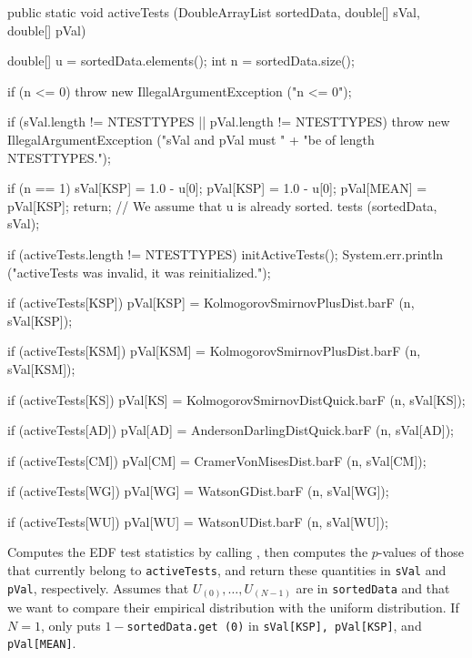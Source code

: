 \begin{htmlonly}
\end{htmlonly}
\begin{code}

   public static void activeTests (DoubleArrayList sortedData,
                                   double[] sVal, double[] pVal)\begin{hide} {

      double[] u = sortedData.elements();
      int n = sortedData.size();

      if (n <= 0)
        throw new IllegalArgumentException ("n <= 0");

      if (sVal.length != NTESTTYPES || pVal.length != NTESTTYPES)
        throw new IllegalArgumentException ("sVal and pVal must " +
              "be of length NTESTTYPES.");

      if (n == 1) {
         sVal[KSP] = 1.0 - u[0];
         pVal[KSP] = 1.0 - u[0];
         pVal[MEAN] = pVal[KSP];
         return;
      }
      // We assume that u is already sorted.
      tests (sortedData, sVal);

      if (activeTests.length != NTESTTYPES) {
        initActiveTests();
        System.err.println ("activeTests was invalid, it was reinitialized.");
      }

      if (activeTests[KSP])
         pVal[KSP] = KolmogorovSmirnovPlusDist.barF (n, sVal[KSP]);

      if (activeTests[KSM])
         pVal[KSM] = KolmogorovSmirnovPlusDist.barF (n, sVal[KSM]);

      if (activeTests[KS])
         pVal[KS] = KolmogorovSmirnovDistQuick.barF (n, sVal[KS]);

      if (activeTests[AD])
         pVal[AD] = AndersonDarlingDistQuick.barF (n, sVal[AD]);

      if (activeTests[CM])
         pVal[CM] = CramerVonMisesDist.barF (n, sVal[CM]);

      if (activeTests[WG])
         pVal[WG] = WatsonGDist.barF (n, sVal[WG]);

      if (activeTests[WU])
         pVal[WU] = WatsonUDist.barF (n, sVal[WU]);
   }\end{hide}
\end{code}
\begin{tabb} Computes the EDF test statistics by calling
  , then computes the $p$-values of those
  that currently belong to \texttt{activeTests},
  and return these quantities in \texttt{sVal} and \texttt{pVal}, respectively.
  Assumes that $U_{(0)},\dots,U_{(N-1)}$ are in \texttt{sortedData}
  and that we want to compare their empirical distribution
  with the uniform distribution.
  If $N = 1$, only puts $1 - {}$\texttt{sortedData.get (0)} in
  \texttt{sVal[KSP], pVal[KSP]}, and \texttt{pVal[MEAN]}.
\end{tabb}
